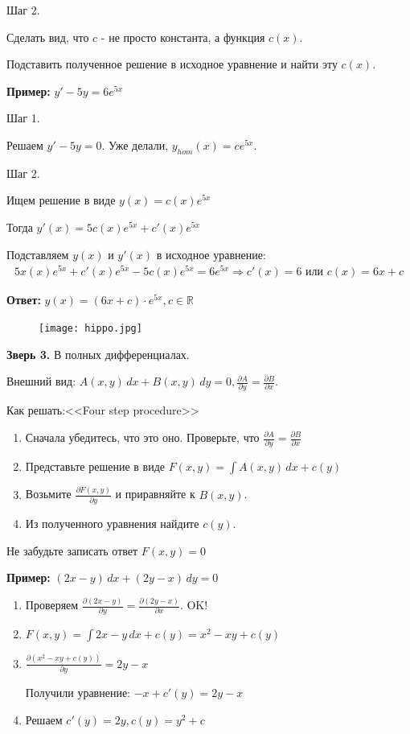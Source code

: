 \documentclass[10pt,a4paper]{article}
\begin{document}
\par Шаг 2.
\par Сделать вид, что $c$ - не просто константа, а функция $c(x)$.
\par Подставить полученное решение в исходное уравнение и найти эту $c(x)$.
\par \textbf{Пример:} $y' - 5y = 6e^{5x}$
\par Шаг 1.
\par Решаем $y' - 5y = 0$. Уже делали, $y_{hom}(x) = ce^{5x}$.
\par Шаг 2.
\par Ищем решение в виде $y(x) = c(x) e^{5x}$
\par Тогда $y'(x) = 5c(x) e^{5x} + c'(x)e^{5x}$
\par Подставляем $y(x)$ и $y'(x)$ в исходное уравнение:
\begin{eqnarray*}
5x(x) e^{5x} + c'(x) e^{5x} - 5c(x)e^{5x} = 6e^{5x} \Rightarrow c'(x) = 6 \text{ или } c(x) = 6x + c
\end{eqnarray*}
\par \textbf{Ответ:} $y(x) = (6x + c) \cdot e^{5x}, c \in \mathbb{R}$ \\
\newpage{}
\pagecolor{magenta}
\begin{figure}[h]
\centering
\texttt{[image: hippo.jpg]}
\end{figure}
\par \textbf{Зверь 3.} В полных дифференциалах.
\par Внешний вид: $A(x, y) \, dx + B(x,y) \, dy = 0, \frac{\partial{A}}{\partial{y}} = \frac{\partial{B}}{\partial{x}}$.
\par Как решать:<<Four step procedure>>
\begin{enumerate}
\item Сначала убедитесь, что это оно. Проверьте, что $\frac{\partial{A}}{\partial{y}} = \frac{\partial{B}}{\partial{x}}$
\item Представьте решение в виде $F(x,y) = \int A(x,y) \, dx + c(y)$
\item Возьмите $\frac{\partial{F(x,y)}}{\partial{y}}$ и приравняйте к $B(x,y)$.
\item Из полученного уравнения найдите $c(y)$.
\end{enumerate}
\par Не забудьте записать ответ $F(x,y) = 0$
\par \textbf{Пример:} $(2x - y) \, dx + (2y - x) \, dy = 0$
\begin{enumerate}
\item Проверяем $\frac{\partial{(2x-y)}}{\partial{y}} = \frac{\partial{(2y-x)}}{\partial{x}}$. OK!
\item $F(x,y) = \int 2x - y \, dx + c(y) = x^2 - xy + c(y)$
\item $\frac{\partial{(x^2 - xy + c(y))}}{\partial{y}} = 2y - x$
\par Получили уравнение: $ -x + c'(y) = 2y - x$
\item Решаем $c'(y) = 2y, c(y) = y^2 + c$
\end{enumerate}
\end{document}
